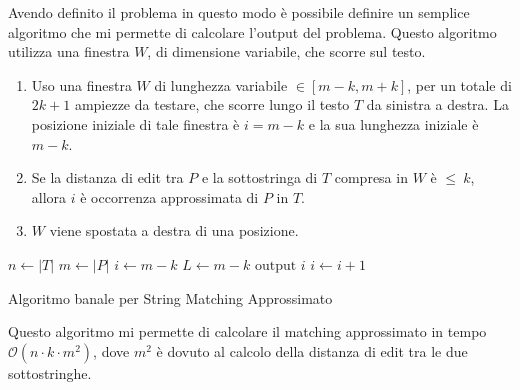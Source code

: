 Avendo definito il problema in questo modo è possibile definire un semplice
algoritmo che mi permette di calcolare l'output del problema. Questo algoritmo
utilizza una finestra $W$, di dimensione variabile, che scorre sul testo.
\begin{enumerate}
    \item Uso una finestra $W$ di lunghezza variabile $\in [m - k, m + k]$, per
          un totale di $2k+1$ ampiezze da testare, che scorre lungo il testo $T$ da
          sinistra a destra. La posizione iniziale di tale finestra è $i = m - k$ e
          la sua lunghezza iniziale è $m - k$.
    \item Se la distanza di edit tra $P$ e la sottostringa di $T$ compresa in $W$
          è $\leq \ k$, allora $i$ è occorrenza approssimata di $P$ in $T$.
    \item $W$ viene spostata a destra di una posizione.
\end{enumerate}
\begin{algorithm}
    \begin{algorithmic}
        \State $n\gets |T|$
        \State $m \gets |P|$
        \State $i\gets m - k$
        \State $L \gets  m - k$
        \State $\text{output } i$
        \EndIf
        \EndWhile
        \State $i \gets i + 1$
        \EndWhile
        \EndFunction
    \end{algorithmic}
    \caption{Algoritmo banale per String Matching Approssimato}
\end{algorithm}

Questo algoritmo mi permette di calcolare il matching approssimato in tempo
$\mathcal{O}(n \cdot k \cdot m^2)$, dove $m^2$ è dovuto al calcolo della distanza
di edit tra le due sottostringhe.
